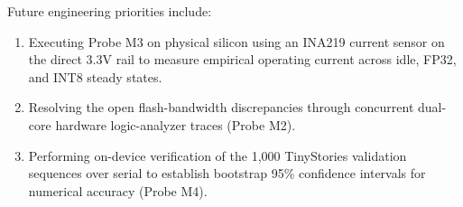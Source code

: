 \documentclass[10pt,a4paper]{article}
\begin{document}
Future engineering priorities include:
\begin{enumerate}
    \item Executing Probe M3 on physical silicon using an INA219 current sensor on the direct 3.3V rail to measure empirical operating current across idle, FP32, and INT8 steady states.
    \item Resolving the open flash-bandwidth discrepancies through concurrent dual-core hardware logic-analyzer traces (Probe M2).
    \item Performing on-device verification of the 1,000 TinyStories validation sequences over serial to establish bootstrap 95\% confidence intervals for numerical accuracy (Probe M4).
\end{enumerate}



\end{document}
